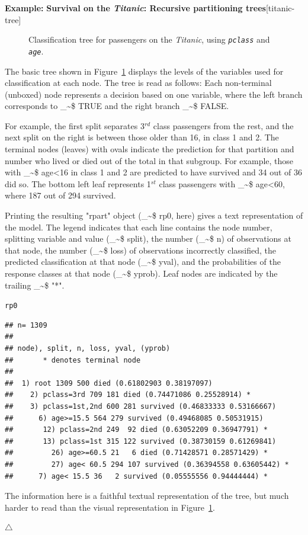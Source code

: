\documentclass{article}
\makeatletter
\newcommand{\hlstd}[1]{\textcolor[rgb]{0.345,0.345,0.345}{#1}}%
\newenvironment{kframe}{%
 \def\at@end@of@kframe{}%
 \ifinner\ifhmode%
  \def\at@end@of@kframe{\end{minipage}}%
  \begin{minipage}{\columnwidth}%
 \fi\fi%
 \def\FrameCommand##1{\hskip\@totalleftmargin \hskip-\fboxsep
 \colorbox{shadecolor}{##1}\hskip-\fboxsep
     \hskip-\linewidth \hskip-\@totalleftmargin \hskip\columnwidth}%
 \MakeFramed {\advance\hsize-\width
   \@totalleftmargin\z@ \linewidth\hsize
   \@setminipage}}%
 {\par\unskip\endMakeFramed%
 \at@end@of@kframe}
\newenvironment{knitrout}{}{} %
\newcommand{\figref}[1]{Figure~\ref{#1}}
\newcommand{\var}[1]{\textit{\texttt{#1}}}
\newcommand{\class}[1]{\textsf{"#1"}}
\newcommand\code{\bgroup\@makeother\_\@makeother\~\@makeother\$\@codex}
\def\@codex#1{{\normalfont\ttfamily\hyphenchar\font=-1 #1}\egroup}
\newenvironment{Example}[2][unnamed-example]%
  {\medskip\noindent\textbf{\textsf{Example:}}
   \textbf{#2}\hfill [#1]\par\smallskip
  }
  {\hfill $\triangle$}
\makeatother
\begin{document}
\begin{Example}[titanic-tree]{Survival on the \emph{Titanic}: Recursive partitioning trees}
\begin{knitrout}
\begin{figure}[hbt!]
{}

\caption[Classification tree for passengers on the \emph{Titanic}, using \var{pclass} and \var{age}]{Classification tree for passengers on the \emph{Titanic}, using \var{pclass} and \var{age}.}\label{fig:rp0}
\end{figure}


\end{knitrout}

The basic tree shown
in \figref{fig:rp0} displays the levels of the variables used for
classification at each node. 
The tree is read as follows:
Each non-terminal (unboxed) node represents a decision based on one variable,
where the left branch corresponds to \code{TRUE} and the right branch \code{FALSE}.

For example, the first split separates 3$^{rd}$
class passengers from the rest, and the next split on the right is between those older
than 16, in class 1 and 2.  
The terminal nodes (leaves) with ovals indicate the
prediction for that partition and number who lived or died out of the
total in that subgroup. For example, those with \code{age<16} in class
1 and 2 are predicted to have survived and 34 out of 36 did so.
The bottom left leaf represents 1$^{st}$ class passengers with \code{age<60},
where 187 out of 294 survived.

Printing the resulting \class{rpart} object
(\code{rp0}, here) gives a text representation of the model.
The legend indicates that each line contains the node number,
splitting variable and value (\code{split}), 
the number (\code{n}) of observations at that node,
the number (\code{loss}) of observations incorrectly classified,
the predicted classification at that node (\code{yval}),
and the probabilities of the response classes at that node
(\code{yprob}).  Leaf nodes are indicated by the trailing \code{"*"}.
\begin{knitrout}
\color{fgcolor}\begin{kframe}
\begin{alltt}
\hlstd{rp0}
\end{alltt}
\begin{verbatim}
## n= 1309 
## 
## node), split, n, loss, yval, (yprob)
##       * denotes terminal node
## 
##  1) root 1309 500 died (0.61802903 0.38197097)  
##    2) pclass=3rd 709 181 died (0.74471086 0.25528914) *
##    3) pclass=1st,2nd 600 281 survived (0.46833333 0.53166667)  
##      6) age>=15.5 564 279 survived (0.49468085 0.50531915)  
##       12) pclass=2nd 249  92 died (0.63052209 0.36947791) *
##       13) pclass=1st 315 122 survived (0.38730159 0.61269841)  
##         26) age>=60.5 21   6 died (0.71428571 0.28571429) *
##         27) age< 60.5 294 107 survived (0.36394558 0.63605442) *
##      7) age< 15.5 36   2 survived (0.05555556 0.94444444) *
\end{verbatim}
\end{kframe}
\end{knitrout}
The information here is a faithful textual representation of the
tree, but much harder to read than the visual representation in
\figref{fig:rp0}.



\end{Example}
\end{document}
